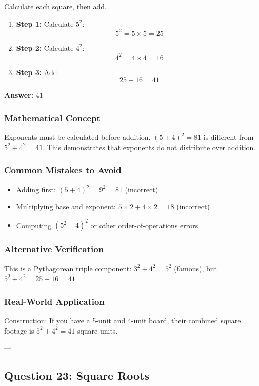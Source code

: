 \documentclass[12pt]{article}
\begin{document}
Calculate each square, then add.

\begin{enumerate}
\item \textbf{Step 1:} Calculate $5^2$:
  \[
  5^2 = 5 \times 5 = 25
  \]
\item \textbf{Step 2:} Calculate $4^2$:
  \[
  4^2 = 4 \times 4 = 16
  \]
\item \textbf{Step 3:} Add:
  \[
  25 + 16 = 41
  \]
\end{enumerate}

\textbf{Answer: } $41$

\subsubsection*{Mathematical Concept}
Exponents must be calculated before addition. $(5 + 4)^2 = 81$ is different from $5^2 + 4^2 = 41$. This demonstrates that exponents do not distribute over addition.

\subsubsection*{Common Mistakes to Avoid}
\begin{itemize}
\item Adding first: $(5 + 4)^2 = 9^2 = 81$ (incorrect)
\item Multiplying base and exponent: $5 \times 2 + 4 \times 2 = 18$ (incorrect)
\item Computing $(5^2 + 4)^2$ or other order-of-operations errors
\end{itemize}

\subsubsection*{Alternative Verification}
This is a Pythagorean triple component: $3^2 + 4^2 = 5^2$ (famous), but $5^2 + 4^2 = 25 + 16 = 41$ 

\subsubsection*{Real-World Application}
Construction: If you have a 5-unit and 4-unit board, their combined square footage is $5^2 + 4^2 = 41$ square units.

---

\subsection{Question 23: Square Roots}
\end{document}
